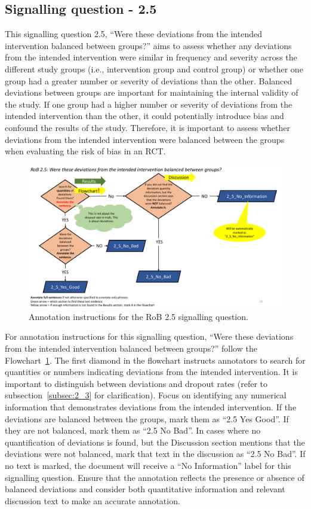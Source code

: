 \documentclass[sn-mathphys,Numbered]{sn-jnl}%
\begin{document}
\subsection*{Signalling question - 2.5 }
%
This signalling question 2.5, ``Were these deviations from the intended intervention balanced between groups?'' aims to assess whether any deviations from the intended intervention were similar in frequency and severity across the different study groups (i.e., intervention group and control group) or whether one group had a greater number or severity of deviations than the other.
Balanced deviations between groups are important for maintaining the internal validity of the study.
If one group had a higher number or severity of deviations from the intended intervention than the other, it could potentially introduce bias and confound the results of the study.
Therefore, it is important to assess whether deviations from the intended intervention were balanced between the groups when evaluating the risk of bias in an RCT.


%
%
%
\begin{figure}[hbt]
    \centering
    \includegraphics[width=\textwidth]{figures/2_5.pdf}
    \caption{Annotation instructions for the RoB 2.5 signalling question.}
    \label{fig:2_5}
\end{figure}
%
%
%


For annotation instructions for this signalling question, ``Were these deviations from the intended intervention balanced between groups?'' follow the Flowchart~\ref{fig:2_5}.
The first diamond in the flowchart instructs annotators to search for quantities or numbers indicating deviations from the intended intervention.
It is important to distinguish between deviations and dropout rates (refer to subsection~\ref{subsec:2_3} for clarification).
Focus on identifying any numerical information that demonstrates deviations from the intended intervention.
If the deviations are balanced between the groups, mark them as ``2.5 Yes Good''.
If they are not balanced, mark them as ``2.5 No Bad''.
In cases where no quantification of deviations is found, but the Discussion section mentions that the deviations were not balanced, mark that text in the discussion as ``2.5 No Bad''.
If no text is marked, the document will receive a ``No Information'' label for this signalling question.
Ensure that the annotation reflects the presence or absence of balanced deviations and consider both quantitative information and relevant discussion text to make an accurate annotation.
%
%
%
\end{document}

